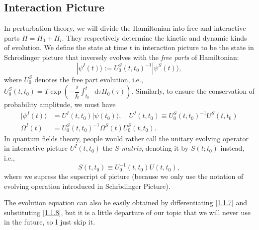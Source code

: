 \documentclass[b5paper,10pt,UTF8]{book}
\newcommand*\dd{\mathop{}\!\mathrm{d}}
\numberwithin{equation}{section}
\begin{document}
		\subsection{Interaction Picture}
			In perturbation theory, we will divide the Hamiltonian into free and interactive parts $H=H_0+H_i$. They respectively determine the kinetic and dynamic kinds of evolution. We define the state at time $t$ in interaction picture to be the state in Schr$\ddot{\text{o}}$dinger picture that inversely evolves with the \emph{free parts} of Hamiltonian:
			\begin{equation}\label{1.1.6}
				|\psi^I(t)\rangle:=U_{0}^S(t,t_0)^{-1}|\psi^S(t)\rangle,
			\end{equation}
			where $U_0^S$ denotes the free part evolution, i.e., $\displaystyle U_{0}^S(t,t_0)=T\exp\left(-\dfrac{i}{\hbar}\int_{t_0}^t\dd\tau H_0(\tau)\right)$. Similarly, to ensure the conservation of probability amplitude, we must have
			\begin{align}
				|\psi^I(t)\rangle&=U^I(t,t_0)|\psi(t_0)\rangle,\quad U^I(t,t_0)\equiv U_0^S(t,t_0)^{-1}U^S(t,t_0)\label{1.1.7}\\
				\Omega^I(t)&=U_0^S(t,t_0)^{-1}\Omega^S(t)U_0^S(t,t_0).\label{1.1.8}
			\end{align}
			In quantum fields theory, people would rather call the unitary evolving operator in interactive picture $U^I(t,t_0)$ the \emph{$S$-matrix}, denoting it by $S(t;t_0)$ instead, i.e.,
			\begin{equation}\label{1.1.10}
				S(t,t_0)\equiv U_0^{-1}(t,t_0)U(t,t_0),
			\end{equation}
			where we supress the supscript of picture (because we only use the notation of evolving operation introduced in Schr$\ddot{\text{o}}$dinger Picture).\par
			The evolution equation can also be easily obtained by differentiating \eqref{1.1.7} and substituting \eqref{1.1.8}, but it is a little departure of our topic that we will never use in the future, so I just skip it.
\end{document}
